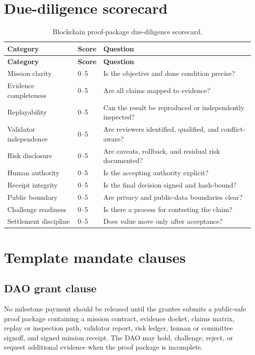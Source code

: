 \section{Due-diligence scorecard}

\begin{longtable}{p{} p{} p{}}
\caption{Blockchain proof-package due-diligence scorecard.}\\
\toprule
\textbf{Category} & \textbf{Score} & \textbf{Question}\\
\midrule
\endfirsthead
\toprule
\textbf{Category} & \textbf{Score} & \textbf{Question}\\
\midrule
\endhead
Mission clarity & 0--5 & Is the objective and done condition precise? \\
Evidence completeness & 0--5 & Are all claims mapped to evidence? \\
Replayability & 0--5 & Can the result be reproduced or independently inspected? \\
Validator independence & 0--5 & Are reviewers identified, qualified, and conflict-aware? \\
Risk disclosure & 0--5 & Are caveats, rollback, and residual risk documented? \\
Human authority & 0--5 & Is the accepting authority explicit? \\
Receipt integrity & 0--5 & Is the final decision signed and hash-bound? \\
Public boundary & 0--5 & Are privacy and public-data boundaries clear? \\
Challenge readiness & 0--5 & Is there a process for contesting the claim? \\
Settlement discipline & 0--5 & Does value move only after acceptance? \\
\bottomrule
\end{longtable}

\section{Template mandate clauses}

\subsection{DAO grant clause}

No milestone payment should be released until the grantee submits a public-safe proof package containing a mission contract, evidence docket, claims matrix, replay or inspection path, validator report, risk ledger, human or committee signoff, and signed mission receipt. The DAO may hold, challenge, reject, or request additional evidence when the proof package is incomplete.

